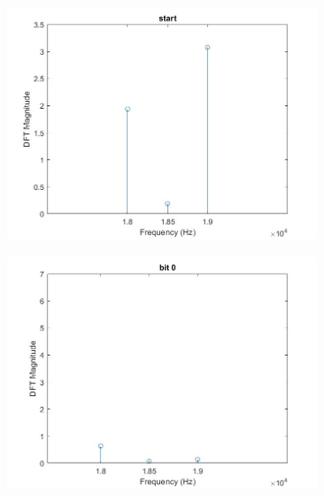 \begin{figure}[H]
    \centering
    \begin{subfigure}{0.48\textwidth}
    \includegraphics[width=\textwidth]{LiveAudioWatermarking/images/start_bit.jpg}
    \caption{}
    \label{}
    \end{subfigure}%
    \hfill
     \begin{subfigure}{0.48\textwidth}
    \includegraphics[width=\textwidth]{LiveAudioWatermarking/images/bit0.jpg}
    \caption{}
    \label{}
    \end{subfigure}\\
        \begin{subfigure}{0.48\textwidth}

\end{subfigure}
\end{figure}
